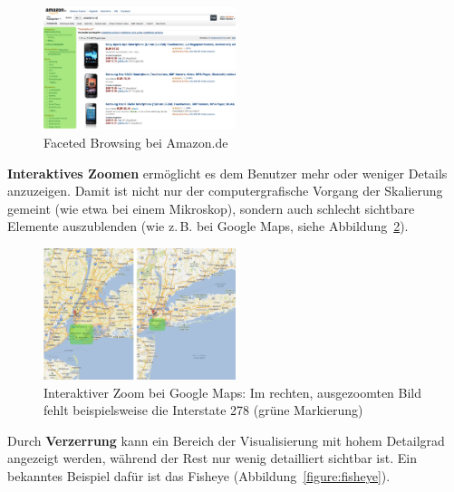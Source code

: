 \documentclass[
	headsepline,
	footsepline,
	fontsize=12pt,
	bibliography=totoc
]{scrbook}
\begin{document}
\begin{figure}[htbp]
   \centering
   \includegraphics[width=0.5\textwidth]{images/grundlagen-faceted_browsing.png}
   \caption{Faceted Browsing bei Amazon.de}
   \label{figure:faceted_browsing}
\end{figure}


\textbf{Interaktives Zoomen} ermöglicht es dem Benutzer mehr oder weniger Details anzuzeigen. Damit ist nicht nur der computergrafische Vorgang der Skalierung gemeint (wie etwa bei einem Mikroskop), sondern auch schlecht sichtbare Elemente auszublenden (wie z.\,B. bei Google Maps, siehe Abbildung~\ref{figure:zoom}).

\begin{figure}[htbp]
   \centering
   \includegraphics[width=0.5\textwidth]{images/grundlagen-zoom.png}
   \caption{Interaktiver Zoom bei Google Maps: Im rechten, ausgezoomten Bild fehlt beispielsweise die Interstate 278 (grüne Markierung)}
   \label{figure:zoom}
\end{figure}


Durch \textbf{Verzerrung} kann ein Bereich der Visualisierung mit hohem Detailgrad angezeigt werden, während der Rest nur wenig detailliert sichtbar ist. Ein bekanntes Beispiel dafür ist das Fisheye (Abbildung~\ref{figure:fisheye}).
\end{document}
